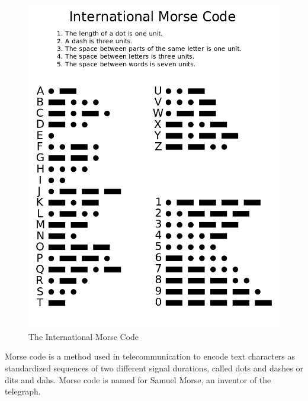 \documentclass[14pt]{report}
\begin{document}
				\begin{figure}[h]
					\includegraphics[width=12cm]{Morse Code.png}
					\centering
					\caption{The International Morse Code}
				\end{figure}

				Morse code is a method used in telecommunication to encode text characters as standardized sequences of two different signal durations, called dots and dashes or dits and dahs. Morse code is named for Samuel Morse, an inventor of the telegraph.\\
\end{document}
